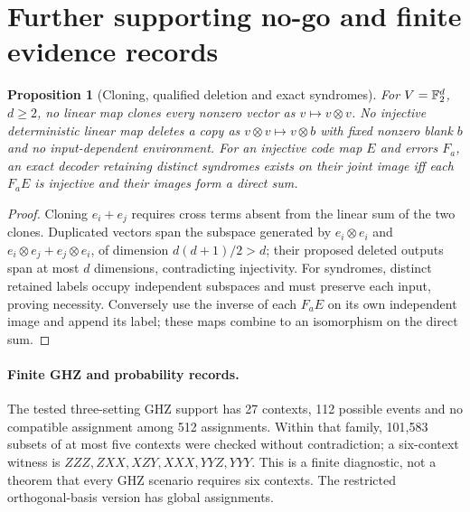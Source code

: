 \documentclass[11pt]{article}
\newtheorem{proposition}[theorem]{Proposition}
\theoremstyle{remark}
\begin{document}
\section{Further supporting no-go and finite evidence records}
\label{sec:diagnostics}
\begin{proposition}[Cloning, qualified deletion and exact syndromes]
For $V=\mathbb F_2^d$, $d\geq2$, no linear map clones every nonzero vector as
$v\mapsto v\otimes v$. No injective deterministic linear map deletes a copy
as $v\otimes v\mapsto v\otimes b$ with fixed nonzero blank $b$ and no
input-dependent environment. For an injective code map $E$ and errors $F_a$,
an exact decoder retaining distinct syndromes exists on their joint image iff
each $F_aE$ is injective and their images form a direct sum.
\end{proposition}
\begin{proof}
Cloning $e_i+e_j$ requires cross terms absent from the linear sum of the two
clones. Duplicated vectors span the subspace generated by $e_i\otimes e_i$
and $e_i\otimes e_j+e_j\otimes e_i$, of dimension $d(d+1)/2>d$; their proposed
deleted outputs span at most $d$ dimensions, contradicting injectivity.
For syndromes, distinct retained labels occupy independent subspaces and must
preserve each input, proving necessity. Conversely use the inverse of each
$F_aE$ on its own independent image and append its label; these maps combine
to an isomorphism on the direct sum.
\end{proof}

\paragraph{Finite GHZ and probability records.}
The tested three-setting GHZ support has 27 contexts, 112 possible events and
no compatible assignment among 512 assignments. Within that family, 101,583
subsets of at most five contexts were checked without contradiction; a
six-context witness is $ZZZ,ZXX,XZY,XXX,YYZ,YYY$. This is a finite diagnostic,
not a theorem that every GHZ scenario requires six contexts. The restricted
orthogonal-basis version has global assignments.
\end{document}

